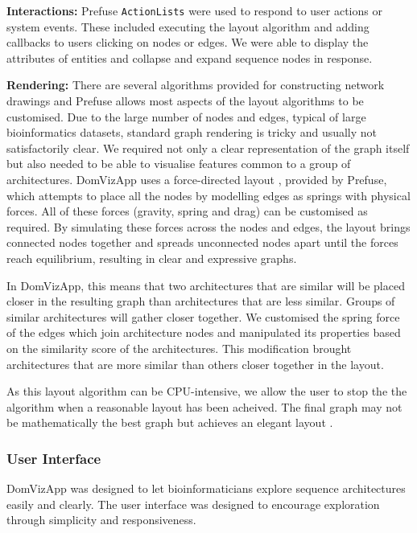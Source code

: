 \textbf{Interactions:} Prefuse \texttt{ActionLists} were used to respond to user actions or system events. These included executing the layout algorithm and adding callbacks to users clicking on nodes or edges. We were able to display the attributes of entities and collapse and expand sequence nodes in response.

\textbf{Rendering:} There are several algorithms provided for constructing network drawings and Prefuse allows most aspects of the layout algorithms to be customised. Due to the large number of nodes and edges, typical of large bioinformatics datasets, standard graph rendering is tricky and usually not satisfactorily clear. We required not only a clear representation of the graph itself but also needed to be able to visualise features common to a group of architectures. DomVizApp uses a force-directed layout \cite{force}, provided by Prefuse, which attempts to place all the nodes by modelling edges as springs with physical forces. All of these forces (gravity, spring and drag) can be customised as required. By simulating these forces across the nodes and edges, the layout brings connected nodes together and spreads unconnected nodes apart until the forces reach equilibrium, resulting in clear and expressive graphs. 

In DomVizApp, this means that two architectures that are similar will be placed closer in the resulting graph than architectures that are less similar. Groups of similar architectures will gather closer together. We customised the spring force of the edges which join architecture nodes and manipulated its properties based on the similarity score of the architectures. This modification brought architectures that are more similar than others closer together in the layout.

As this layout algorithm can be CPU-intensive, we allow the user to stop the the algorithm when a reasonable layout has been acheived. The final graph may not be mathematically the best graph but achieves an elegant layout \cite{force}.

\subsubsection{User Interface}
DomVizApp was designed to let bioinformaticians explore sequence architectures easily and clearly. The user interface was designed to encourage exploration through simplicity and responsiveness.

